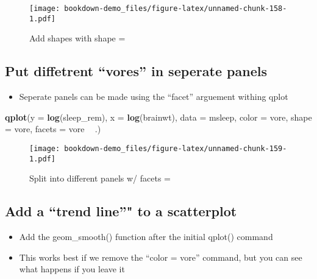 \documentclass[]{book}
\newenvironment{Shaded}{\begin{snugshade}}{\end{snugshade}}
\newcommand{\KeywordTok}[1]{\textcolor[rgb]{0.13,0.29,0.53}{\textbf{#1}}}
\newcommand{\DataTypeTok}[1]{\textcolor[rgb]{0.13,0.29,0.53}{#1}}
\newcommand{\StringTok}[1]{\textcolor[rgb]{0.31,0.60,0.02}{#1}}
\newcommand{\OperatorTok}[1]{\textcolor[rgb]{0.81,0.36,0.00}{\textbf{#1}}}
\newcommand{\NormalTok}[1]{#1}
\providecommand{\tightlist}{%
  \setlength{\itemsep}{0pt}\setlength{\parskip}{0pt}}
\theoremstyle{definition}
\theoremstyle{definition}
\theoremstyle{definition}
\theoremstyle{remark}
\begin{document}
\begin{figure}
\centering
\texttt{[image: bookdown-demo\_files/figure-latex/unnamed-chunk-158-1.pdf]}
\caption{\label{fig:unnamed-chunk-158}Add shapes with shape =}
\end{figure}

\subsection{\texorpdfstring{Put diffetrent ``vores'' in seperate
panels}{Put diffetrent vores in seperate panels}}\label{put-diffetrent-vores-in-seperate-panels}

\begin{itemize}
\tightlist
\item
  Seperate panels can be made using the ``facet'' arguement withing
  qplot
\end{itemize}

\begin{Shaded}
\begin{Highlighting}[]
\KeywordTok{qplot}\NormalTok{(}\DataTypeTok{y =} \KeywordTok{log}\NormalTok{(sleep_rem),}
      \DataTypeTok{x =} \KeywordTok{log}\NormalTok{(brainwt), }
      \DataTypeTok{data =}\NormalTok{ msleep,}
      \DataTypeTok{color =}\NormalTok{ vore,}
      \DataTypeTok{shape =}\NormalTok{ vore,}
      \DataTypeTok{facets =}\NormalTok{ vore }\OperatorTok{~}\StringTok{ }\NormalTok{.)}
\end{Highlighting}
\end{Shaded}

\begin{figure}
\centering
\texttt{[image: bookdown-demo\_files/figure-latex/unnamed-chunk-159-1.pdf]}
\caption{\label{fig:unnamed-chunk-159}Split into different panels w/ facets
=}
\end{figure}

\subsection{\texorpdfstring{Add a ``trend line''" to a
scatterplot}{Add a trend line" to a scatterplot}}\label{add-a-trend-line-to-a-scatterplot}

\begin{itemize}
\tightlist
\item
  Add the geom\_smooth() function after the initial qplot() command
\item
  This works best if we remove the ``color = vore'' command, but you can
  see what happens if you leave it
\end{itemize}
\end{document}
